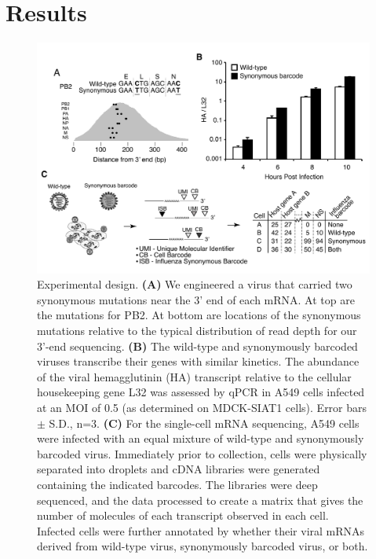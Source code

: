 \documentclass[9pt,lineno]{elife}
\begin{document}
\section{Results}
\begin{figure}
\centerline{\includegraphics[width=0.8\linewidth]{figures/Workflow/workflow.pdf}}
\caption{\label{fig:workflow} Experimental design.
{\bf (A)}  
We engineered a virus that carried two synonymous mutations near the 3' end of each mRNA.
At top are the mutations for PB2.
At bottom are locations of the synonymous mutations relative to the typical distribution of read depth for our 3'-end sequencing.
{\bf (B)} 
The wild-type and synonymously barcoded viruses transcribe their genes with similar kinetics. 
The abundance of the viral hemagglutinin (HA) transcript relative to the cellular housekeeping gene L32 was assessed by qPCR in A549 cells infected at an MOI of 0.5 (as determined on MDCK-SIAT1 cells).
Error bars $\pm$ S.D., n=3.
{\bf (C)}  
For the single-cell mRNA sequencing, A549 cells were infected with an equal mixture of wild-type and synonymously barcoded virus. 
Immediately prior to collection, cells were physically separated into droplets and cDNA libraries were generated containing the indicated barcodes. 
The libraries were deep sequenced, and the data processed to create a matrix that gives the number of molecules of each transcript observed in each cell.
Infected cells were further annotated by whether their viral mRNAs derived from wild-type virus, synonymously barcoded virus, or both.
}
\end{figure}
\end{document}
